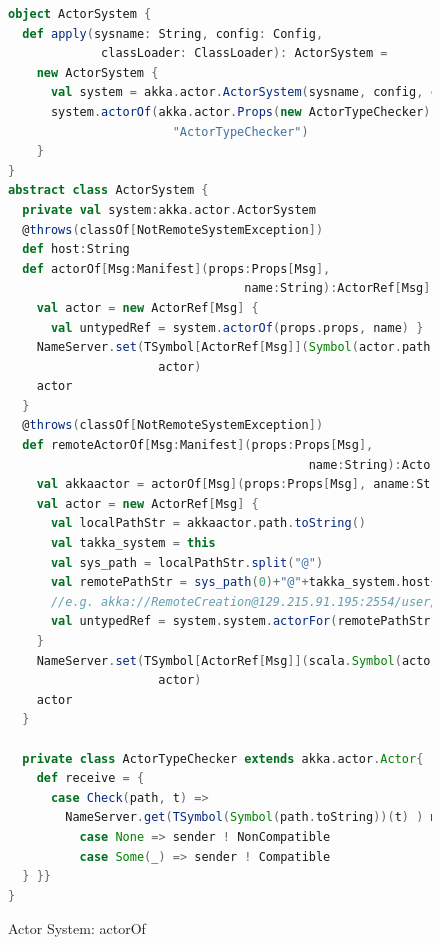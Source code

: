 \begin{figure}[p]
\begin{lstlisting}[language=scala]
object ActorSystem {
  def apply(sysname: String, config: Config,
             classLoader: ClassLoader): ActorSystem = 
    new ActorSystem {
      val system = akka.actor.ActorSystem(sysname, config, classLoader)
      system.actorOf(akka.actor.Props(new ActorTypeChecker),
                       "ActorTypeChecker")
    }
}
abstract class ActorSystem {
  private val system:akka.actor.ActorSystem  
  @throws(classOf[NotRemoteSystemException])
  def host:String
  def actorOf[Msg:Manifest](props:Props[Msg],
                                 name:String):ActorRef[Msg] = {
    val actor = new ActorRef[Msg] {
      val untypedRef = system.actorOf(props.props, name) }
    NameServer.set(TSymbol[ActorRef[Msg]](Symbol(actor.path.toString())), 
                     actor)
    actor
  }  
  @throws(classOf[NotRemoteSystemException])
  def remoteActorOf[Msg:Manifest](props:Props[Msg], 
                                          name:String):ActorRef[Msg] = {
    val akkaactor = actorOf[Msg](props:Props[Msg], aname:String)
    val actor = new ActorRef[Msg] {
      val localPathStr = akkaactor.path.toString()
      val takka_system = this
      val sys_path = localPathStr.split("@")
      val remotePathStr = sys_path(0)+"@"+takka_system.host+":"+takka_system.port+sys_path(1)
      //e.g. akka://RemoteCreation@129.215.91.195:2554/user/...
      val untypedRef = system.system.actorFor(remotePathStr)
    }
    NameServer.set(TSymbol[ActorRef[Msg]](scala.Symbol(actor.path.toString())), 
                     actor)
    actor
  }

  private class ActorTypeChecker extends akka.actor.Actor{
    def receive = {
      case Check(path, t) =>
        NameServer.get(TSymbol(Symbol(path.toString))(t) ) match {
          case None => sender ! NonCompatible
          case Some(_) => sender ! Compatible
  } }}
}
\end{lstlisting}
    \caption{Actor System: actorOf}
    \label{takka_actorOf}    
\end{figure}


